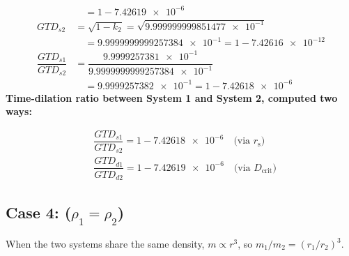 \documentclass[twoside,twocolumn,9pt,fleqn]{article}
\begin{document}
\begin{mdframed}
\begin{align*}
&\quad = 1-\num{7.42619e-6}\\
GTD_{s2} &= \sqrt{1-k_2} = \sqrt{\num{9.999999999851477e-1}}\\
&\quad = \num{9.9999999999257384e-1} = 1-\num{7.42616e-12}\\
\dfrac{GTD_{s1}}{GTD_{s2}} &= \dfrac{\num{9.9999257381e-1}}{\num{9.9999999999257384e-1}}\\
&\quad = \num{9.9999257382e-1} = 1-\num{7.42618e-6}
\end{align*}
\noindent\textbf{Time-dilation ratio between System 1 and System 2, computed two ways:}\par
\begin{align*}
&\dfrac{GTD_{s1}}{GTD_{s2}} = 1-\num{7.42618e-6} \quad \text{(via $r_{\mathrm{s}}$)}\\
&\dfrac{GTD_{d1}}{GTD_{d2}} = 1-\num{7.42619e-6} \quad \text{(via $D_{\mathrm{crit}}$)}
\end{align*}
\end{mdframed}

\newpage
\subsection{Case 4: ($\rho_1 = \rho_2$)}
\label{subsec:example_equal_density_case_4}

When the two systems share the same density, $m \propto r^3$, so $m_1/m_2 = (r_1/r_2)^3$.
\end{document}
